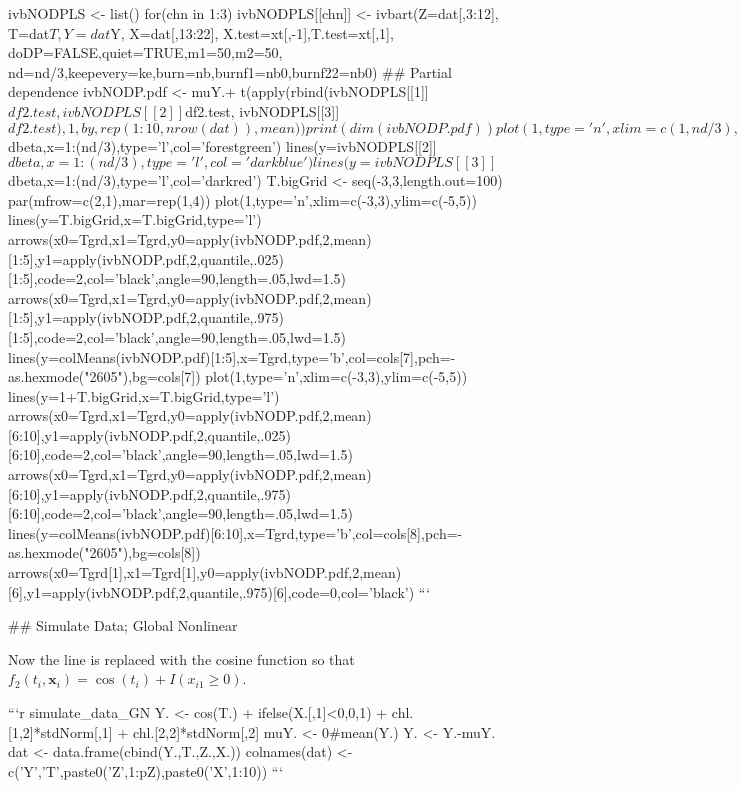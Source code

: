       ivbNODPLS <- list()
        for(chn in 1:3){
            ivbNODPLS[[chn]] <- ivbart(Z=dat[,3:12],
                                       T=dat$T,
                                       Y=dat$Y,
                                       X=dat[,13:22],
                                       X.test=xt[,-1],T.test=xt[,1],
                                       doDP=FALSE,quiet=TRUE,m1=50,m2=50,
                                       nd=nd/3,keepevery=ke,burn=nb,burnf1=nb0,burnf22=nb0)
           }
        ## Partial dependence
        ivbNODP.pdf <- muY.+
            t(apply(rbind(ivbNODPLS[[1]]$df2.test,
                          ivbNODPLS[[2]]$df2.test,
                          ivbNODPLS[[3]]$df2.test),
                    1,by,rep(1:10,nrow(dat)),mean))
    print(dim(ivbNODP.pdf))
    plot(1,type='n',xlim=c(1,nd/3),ylab=expression(beta),xlab='MCMC Iteration')
    lines(y=ivbNODPLS[[1]]$dbeta,x=1:(nd/3),type='l',col='forestgreen')
    lines(y=ivbNODPLS[[2]]$dbeta,x=1:(nd/3),type='l',col='darkblue')
    lines(y=ivbNODPLS[[3]]$dbeta,x=1:(nd/3),type='l',col='darkred')
    T.bigGrid <- seq(-3,3,length.out=100)
    par(mfrow=c(2,1),mar=rep(1,4))
    plot(1,type='n',xlim=c(-3,3),ylim=c(-5,5))
    lines(y=T.bigGrid,x=T.bigGrid,type='l')
    arrows(x0=Tgrd,x1=Tgrd,y0=apply(ivbNODP.pdf,2,mean)[1:5],y1=apply(ivbNODP.pdf,2,quantile,.025)[1:5],code=2,col='black',angle=90,length=.05,lwd=1.5)
    arrows(x0=Tgrd,x1=Tgrd,y0=apply(ivbNODP.pdf,2,mean)[1:5],y1=apply(ivbNODP.pdf,2,quantile,.975)[1:5],code=2,col='black',angle=90,length=.05,lwd=1.5)
    lines(y=colMeans(ivbNODP.pdf)[1:5],x=Tgrd,type='b',col=cols[7],pch=-as.hexmode("2605"),bg=cols[7])
    plot(1,type='n',xlim=c(-3,3),ylim=c(-5,5))
    lines(y=1+T.bigGrid,x=T.bigGrid,type='l')
    arrows(x0=Tgrd,x1=Tgrd,y0=apply(ivbNODP.pdf,2,mean)[6:10],y1=apply(ivbNODP.pdf,2,quantile,.025)[6:10],code=2,col='black',angle=90,length=.05,lwd=1.5)
    arrows(x0=Tgrd,x1=Tgrd,y0=apply(ivbNODP.pdf,2,mean)[6:10],y1=apply(ivbNODP.pdf,2,quantile,.975)[6:10],code=2,col='black',angle=90,length=.05,lwd=1.5)
    lines(y=colMeans(ivbNODP.pdf)[6:10],x=Tgrd,type='b',col=cols[8],pch=-as.hexmode("2605"),bg=cols[8])
    arrows(x0=Tgrd[1],x1=Tgrd[1],y0=apply(ivbNODP.pdf,2,mean)[6],y1=apply(ivbNODP.pdf,2,quantile,.975)[6],code=0,col='black') 
```
    
## Simulate Data; Global Nonlinear

Now the line is replaced with the cosine function so that $f_2(t_i,\mathbf{x}_i)=\cos(t_i)+I(x_{i1}\ge 0)$.
    
```{r simulate_data_GN}
Y. <- cos(T.) + ifelse(X.[,1]<0,0,1) + chl.[1,2]*stdNorm[,1] + chl.[2,2]*stdNorm[,2]
muY. <- 0#mean(Y.)
Y. <- Y.-muY.
dat <- data.frame(cbind(Y.,T.,Z.,X.))
colnames(dat) <- c('Y','T',paste0('Z',1:pZ),paste0('X',1:10))
```


